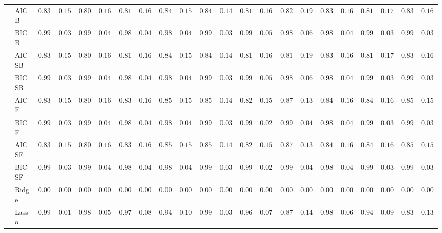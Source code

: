 \begin{tabular}{llllllllllllllllllllll}
	& AIC B  & $0.8317$ & $0.1526$ & $0.8033$ & $0.1698$ & $0.8167$ & $0.1683$ & $0.8467$ & $0.1583$ & $0.8467$ & $0.1473$ & $0.8100$ & $0.1675$ & $0.8200$ & $0.1934$ & $0.8383$ & $0.1666$ & $0.8183$ & $0.1726$ & $0.8300$ & $0.1624$ \\
	& BIC B  & $0.9917$ & $0.0365$ & $0.9900$ & $0.0463$ & $0.9883$ & $0.0489$ & $0.9867$ & $0.0454$ & $0.9900$ & $0.0398$ & $0.9900$ & $0.0571$ & $0.9850$ & $0.0631$ & $0.9883$ & $0.0489$ & $0.9917$ & $0.0365$ & $0.9917$ & $0.0365$ \\
	& AIC SB  & $0.8317$ & $0.1526$ & $0.8033$ & $0.1698$ & $0.8167$ & $0.1683$ & $0.8467$ & $0.1583$ & $0.8467$ & $0.1473$ & $0.8100$ & $0.1675$ & $0.8183$ & $0.1926$ & $0.8383$ & $0.1666$ & $0.8183$ & $0.1726$ & $0.8300$ & $0.1624$ \\
	& BIC SB  & $0.9917$ & $0.0365$ & $0.9900$ & $0.0463$ & $0.9883$ & $0.0489$ & $0.9867$ & $0.0454$ & $0.9900$ & $0.0398$ & $0.9900$ & $0.0571$ & $0.9850$ & $0.0631$ & $0.9883$ & $0.0489$ & $0.9917$ & $0.0365$ & $0.9917$ & $0.0365$ \\
	& AIC F  & $0.8317$ & $0.1526$ & $0.8033$ & $0.1698$ & $0.8333$ & $0.1658$ & $0.8533$ & $0.1503$ & $0.8500$ & $0.1431$ & $0.8233$ & $0.1514$ & $0.8717$ & $0.1399$ & $0.8417$ & $0.1665$ & $0.8400$ & $0.1640$ & $0.8550$ & $0.1529$ \\
	& BIC F  & $0.9917$ & $0.0365$ & $0.9900$ & $0.0463$ & $0.9883$ & $0.0489$ & $0.9867$ & $0.0454$ & $0.9900$ & $0.0398$ & $0.9950$ & $0.0286$ & $0.9917$ & $0.0435$ & $0.9883$ & $0.0489$ & $0.9917$ & $0.0365$ & $0.9917$ & $0.0365$ \\
	& AIC SF  & $0.8317$ & $0.1526$ & $0.8033$ & $0.1698$ & $0.8333$ & $0.1658$ & $0.8533$ & $0.1503$ & $0.8500$ & $0.1431$ & $0.8233$ & $0.1514$ & $0.8717$ & $0.1399$ & $0.8417$ & $0.1665$ & $0.8400$ & $0.1640$ & $0.8550$ & $0.1529$ \\
	& BIC SF  & $0.9917$ & $0.0365$ & $0.9900$ & $0.0463$ & $0.9883$ & $0.0489$ & $0.9867$ & $0.0454$ & $0.9900$ & $0.0398$ & $0.9950$ & $0.0286$ & $0.9917$ & $0.0435$ & $0.9883$ & $0.0489$ & $0.9917$ & $0.0365$ & $0.9917$ & $0.0365$ \\
	& Ridge  & $0.0000$ & $0.0000$ & $0.0000$ & $0.0000$ & $0.0000$ & $0.0000$ & $0.0000$ & $0.0000$ & $0.0000$ & $0.0000$ & $0.0000$ & $0.0000$ & $0.0000$ & $0.0000$ & $0.0000$ & $0.0000$ & $0.0000$ & $0.0000$ & $0.0000$ & $0.0000$ \\
	& Lasso  & $0.9983$ & $0.0167$ & $0.9850$ & $0.0535$ & $0.9733$ & $0.0811$ & $0.9467$ & $0.1056$ & $0.9917$ & $0.0365$ & $0.9683$ & $0.0738$ & $0.8717$ & $0.1457$ & $0.9800$ & $0.0682$ & $0.9467$ & $0.0914$ & $0.8300$ & $0.1381$ \\

\end{tabular}
